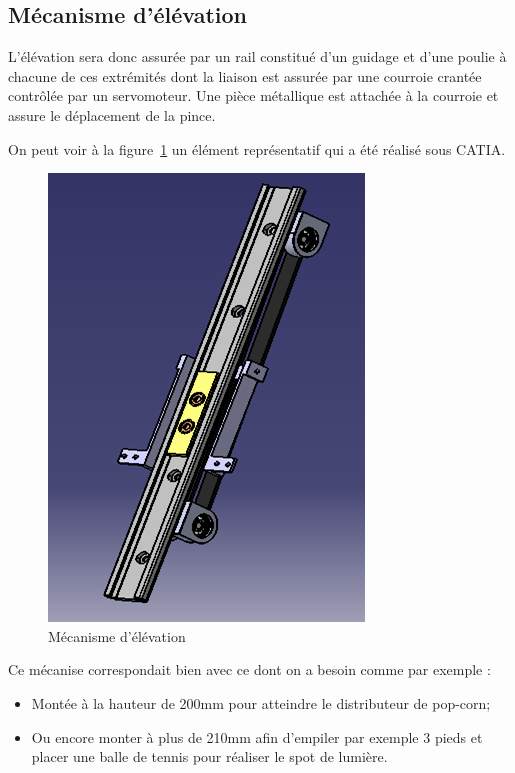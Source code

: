 \subsection{Mécanisme d'élévation}
L'élévation sera donc assurée par un rail constitué d'un guidage et d'une poulie à chacune de ces extrémités dont la liaison est assurée par une courroie crantée contrôlée par un servomoteur. Une pièce métallique est attachée à la courroie et assure le déplacement de la pince.  

\noindent On peut voir à la figure~\ref{fig:Chariot} un élément représentatif qui a été réalisé sous CATIA.

\begin{figure}[!ht]
	\centering
		\includegraphics{chariot.png}
	\caption{Mécanisme d'élévation}
	\label{fig:Chariot}
\end{figure}

\noindent Ce mécanise correspondait bien avec ce dont on a besoin comme par exemple :  

\begin{itemize}
	\item Montée à la hauteur de 200mm pour atteindre le distributeur de pop-corn;
	\item Ou encore monter à plus de 210mm afin d'empiler par exemple 3 pieds et placer une balle de tennis pour réaliser le spot de lumière.
\end{itemize}


